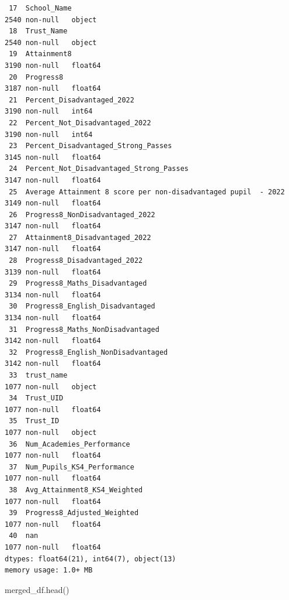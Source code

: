 \documentclass[
  letterpaper,
  DIV=11,
  numbers=noendperiod]{scrartcl}
\newenvironment{Shaded}{\begin{snugshade}}{\end{snugshade}}
\newcommand{\NormalTok}[1]{\textcolor[rgb]{0.00,0.23,0.31}{#1}}
\begin{document}
\begin{verbatim}
 17  School_Name                                                     2540 non-null   object 
 18  Trust_Name                                                      2540 non-null   object 
 19  Attainment8                                                     3190 non-null   float64
 20  Progress8                                                       3187 non-null   float64
 21  Percent_Disadvantaged_2022                                      3190 non-null   int64  
 22  Percent_Not_Disadvantaged_2022                                  3190 non-null   int64  
 23  Percent_Disadvantaged_Strong_Passes                             3145 non-null   float64
 24  Percent_Not_Disadvantaged_Strong_Passes                         3147 non-null   float64
 25  Average Attainment 8 score per non-disadvantaged pupil  - 2022  3149 non-null   float64
 26  Progress8_NonDisadvantaged_2022                                 3147 non-null   float64
 27  Attainment8_Disadvantaged_2022                                  3147 non-null   float64
 28  Progress8_Disadvantaged_2022                                    3139 non-null   float64
 29  Progress8_Maths_Disadvantaged                                   3134 non-null   float64
 30  Progress8_English_Disadvantaged                                 3134 non-null   float64
 31  Progress8_Maths_NonDisadvantaged                                3142 non-null   float64
 32  Progress8_English_NonDisadvantaged                              3142 non-null   float64
 33  trust_name                                                      1077 non-null   object 
 34  Trust_UID                                                       1077 non-null   float64
 35  Trust_ID                                                        1077 non-null   object 
 36  Num_Academies_Performance                                       1077 non-null   float64
 37  Num_Pupils_KS4_Performance                                      1077 non-null   float64
 38  Avg_Attainment8_KS4_Weighted                                    1077 non-null   float64
 39  Progress8_Adjusted_Weighted                                     1077 non-null   float64
 40  nan                                                             1077 non-null   float64
dtypes: float64(21), int64(7), object(13)
memory usage: 1.0+ MB
\end{verbatim}

\begin{Shaded}
\begin{Highlighting}[]
\NormalTok{merged\_df.head()}
\end{Highlighting}
\end{Shaded}
\end{document}
